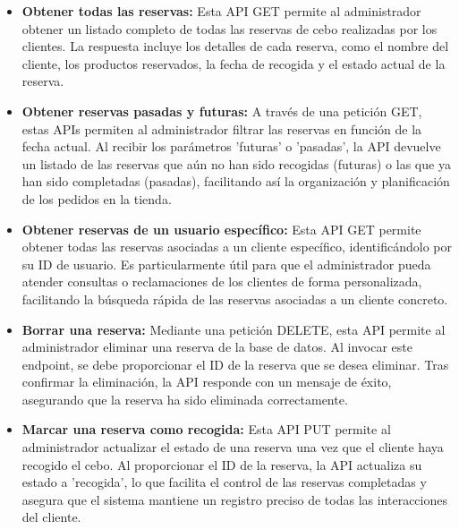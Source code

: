 \begin{itemize}

    \item \textbf{Obtener todas las reservas:} Esta API GET permite al administrador obtener un listado completo de todas las reservas de cebo realizadas por los clientes. La respuesta incluye los detalles de cada reserva, como el nombre del cliente, los productos reservados, la fecha de recogida y el estado actual de la reserva.
    
    \item \textbf{Obtener reservas pasadas y futuras:} A través de una petición GET, estas APIs permiten al administrador filtrar las reservas en función de la fecha actual. Al recibir los parámetros 'futuras' o 'pasadas', la API devuelve un listado de las reservas que aún no han sido recogidas (futuras) o las que ya han sido completadas (pasadas), facilitando así la organización y planificación de los pedidos en la tienda.
    
    \item \textbf{Obtener reservas de un usuario específico:} Esta API GET permite obtener todas las reservas asociadas a un cliente específico, identificándolo por su ID de usuario. Es particularmente útil para que el administrador pueda atender consultas o reclamaciones de los clientes de forma personalizada, facilitando la búsqueda rápida de las reservas asociadas a un cliente concreto.
    
    \item \textbf{Borrar una reserva:} Mediante una petición DELETE, esta API permite al administrador eliminar una reserva de la base de datos. Al invocar este endpoint, se debe proporcionar el ID de la reserva que se desea eliminar. Tras confirmar la eliminación, la API responde con un mensaje de éxito, asegurando que la reserva ha sido eliminada correctamente.
    
    \item \textbf{Marcar una reserva como recogida:} Esta API PUT permite al administrador actualizar el estado de una reserva una vez que el cliente haya recogido el cebo. Al proporcionar el ID de la reserva, la API actualiza su estado a 'recogida', lo que facilita el control de las reservas completadas y asegura que el sistema mantiene un registro preciso de todas las interacciones del cliente.

\end{itemize}

\vspace{0.5cm}

